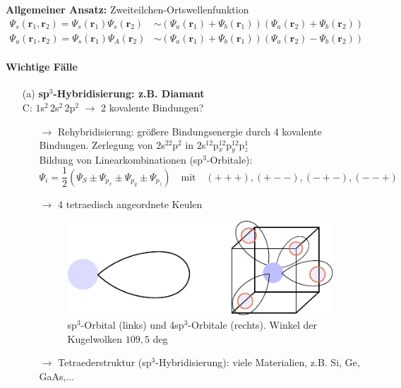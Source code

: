 \textbf{Allgemeiner Ansatz:} Zweiteilchen-Ortswellenfunktion
\begin{align*}
	\Psi_s(\textbf{r}_1,\textbf{r}_2) = \Psi_s(\textbf{r}_1) \Psi_s(\textbf{r}_2) &\sim (\Psi_a(\textbf{r}_1) + \Psi_b(\textbf{r}_1)) (\Psi_a(\textbf{r}_2) + \Psi_b (\textbf{r}_2))\\
	\Psi_a(\textbf{r}_1,\textbf{r}_2) = \Psi_s(\textbf{r}_1) \Psi_A(\textbf{r}_2) &\sim (\Psi_a(\textbf{r}_1) + \Psi_b(\textbf{r}_1)) (\Psi_a(\textbf{r}_2) - \Psi_b (\textbf{r}_2))
\end{align*}

\paragraph{Wichtige Fälle}
\begin{itemize}
	\item[(a)] \textbf{sp$^3$-Hybridisierung: z.B. Diamant}\\
	C: $1$s$^2 \, 2$s$^2 \, 2$p$^2$ $\rightarrow$ 2 kovalente Bindungen?\\
	\begin{itemize}
		\item[$\rightarrow$] Rehybridisierung: größere Bindungsenergie durch 4 kovalente Bindungen. Zerlegung von $2$s$^22$p$^2$ in $2$s$^12$p$_x^12$p$_y^12$p$_z^1$\\
		Bildung von Linearkombinationen (sp$^3$-Orbitale):\\
		$$\Psi_i = \frac{1}{2} (\Psi_S \pm \Psi_{p_x} \pm \Psi_{p_y} \pm \Psi_{p_z}) \quad \text{mit} \quad (+++), (+--), (-+-), (--+)$$
		\item [$\rightarrow$] 4 tetraedisch angeordnete Keulen\\
		\begin{figure}[H]
			\centering
			\includegraphics{figures/1_4bindungen.pdf}
			\caption{sp$^3$-Orbital (links) und 4sp$^3$-Orbitale (rechts). Winkel der Kugelwolken $109,5$ deg }
			\label{}
		\end{figure}
		\item[$\rightarrow$] Tetraederstruktur (sp$^3$-Hybridisierung): viele Materialien, z.B. Si, Ge, GaAs,...

\end{itemize}
\end{itemize}
